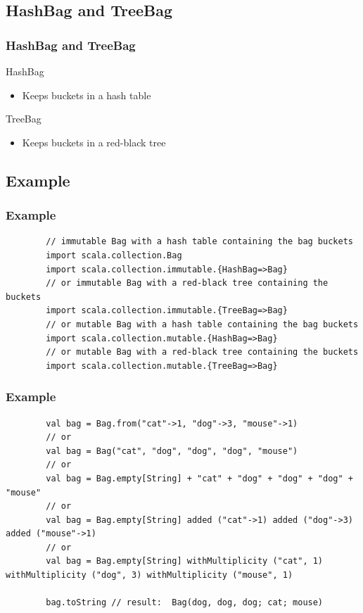 \documentclass{beamer}
\begin{document}
\subsection{HashBag and TreeBag}

\begin{frame}[fragile]
	\frametitle{HashBag and TreeBag}
	\begin{block}{HashBag}
		\begin{itemize}
			\item Keeps buckets in a hash table
		\end{itemize}
	\end{block}	
	\begin{block}{TreeBag}
		\begin{itemize}
			\item Keeps buckets in a red-black tree
		\end{itemize}
	\end{block}	
\end{frame}

\subsection{Example}

\begin{frame}[fragile]
	\frametitle{Example}
	\begin{lstlisting}
		// immutable Bag with a hash table containing the bag buckets
		import scala.collection.Bag
		import scala.collection.immutable.{HashBag=>Bag}
		// or immutable Bag with a red-black tree containing the buckets
		import scala.collection.immutable.{TreeBag=>Bag}
		// or mutable Bag with a hash table containing the bag buckets
		import scala.collection.mutable.{HashBag=>Bag}
		// or mutable Bag with a red-black tree containing the buckets
		import scala.collection.mutable.{TreeBag=>Bag}
	\end{lstlisting}
\end{frame}

\begin{frame}[fragile]
	\frametitle{Example}
	\begin{lstlisting}
		val bag = Bag.from("cat"->1, "dog"->3, "mouse"->1)
		// or 
		val bag = Bag("cat", "dog", "dog", "dog", "mouse")
		// or 
		val bag = Bag.empty[String] + "cat" + "dog" + "dog" + "dog" + "mouse"
		// or 
		val bag = Bag.empty[String] added ("cat"->1) added ("dog"->3) added ("mouse"->1)
		// or 
		val bag = Bag.empty[String] withMultiplicity ("cat", 1) withMultiplicity ("dog", 3) withMultiplicity ("mouse", 1)
		
		bag.toString // result:  Bag(dog, dog, dog; cat; mouse)
	\end{lstlisting}
\end{frame}
\end{document}
